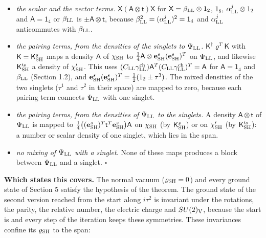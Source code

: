 \documentclass[
  10pt,
]{article}
\providecommand{\tightlist}{%
  \setlength{\itemsep}{0pt}\setlength{\parskip}{0pt}}
\begin{document}
\begin{itemize}
\tightlist
\item
  \emph{the scalar and the vector terms.}
  \(\mathsf X(\mathsf A\otimes\mathsf t)\mathsf X\) for
  \(\mathsf X=\beta_{\rm LL}\otimes\mathsf 1_2\), \(\mathsf 1_8\),
  \(\alpha^j_{\rm LL}\otimes\mathsf 1_2\) and \(\mathsf A=\mathsf 1_4\)
  or \(\beta_{\rm LL}\) is \(\pm\mathsf A\otimes\mathsf t\), because
  \(\beta_{\rm LL}^2=(\alpha^j_{\rm LL})^2=\mathsf 1_4\) and
  \(\alpha^j_{\rm LL}\) anticommutes with \(\beta_{\rm LL}\).
\item
  \emph{the pairing terms, from the densities of the singlets to
  \(\Psi_{\rm LL}\).} \(\mathsf K^\dagger\varrho^T\mathsf K\) with
  \(\mathsf K=\mathsf K^s_{\rm SH}\) maps a density \(\mathsf A\) of
  \(\chi_{\rm SH}\) to
  \(\tfrac14\mathsf A\otimes\mathbf e^s_{\rm SH}(\mathbf e^s_{\rm SH})^T\)
  on \(\Psi_{\rm LL}\), and likewise \(\mathsf K'^s_{\rm SH}\) a density
  of \(\chi'_{\rm SH}\). This uses
  \((C_{\rm LL}\gamma^{\rm ch}_{\rm LL})\mathsf A^T(C_{\rm LL}\gamma^{\rm ch}_{\rm LL})^T=\mathsf A\)
  for \(\mathsf A=\mathsf 1_4\) and \(\beta_{\rm LL}\) (Section 1.2),
  and
  \(\mathbf e^s_{\rm SH}(\mathbf e^s_{\rm SH})^T=\tfrac12(\mathsf 1_2\pm\tau^3)\).
  The mixed densities of the two singlets (\(\tau^1\) and \(\tau^2\) in
  their space) are mapped to zero, because each pairing term connects
  \(\Psi_{\rm LL}\) with one singlet.
\item
  \emph{the pairing terms, from the densities of \(\Psi_{\rm LL}\) to
  the singlets.} A density \(\mathsf A\otimes\mathsf t\) of
  \(\Psi_{\rm LL}\) is mapped to
  \(\tfrac14\big((\mathbf e^s_{\rm SH})^T\mathsf t^T\mathbf e^s_{\rm SH}\big)\mathsf A\)
  on \(\chi_{\rm SH}\) (by \(\mathsf K^s_{\rm SH}\)) or on
  \(\chi'_{\rm SH}\) (by \(\mathsf K'^s_{\rm SH}\)): a number or scalar
  density of one singlet, which lies in the span.
\item
  \emph{no mixing of \(\Psi_{\rm LL}\) with a singlet.} None of these
  maps produces a block between \(\Psi_{\rm LL}\) and a singlet.
  \(\square\)
\end{itemize}

\textbf{Which states this covers.} The normal vacuum
(\(\varrho_{\rm SH}=0\)) and every ground state of Section 5 satisfy the
hypothesis of the theorem. The ground state of the second version
reached from the start along \(i\tau^2\) is invariant under the
rotations, the parity, the relative number, the electric charge and
\(SU(2)_{\rm V}\), because the start is and every step of the iteration
keeps these symmetries. These invariances confine its
\(\varrho_{\rm SH}\) to the span:
\end{document}
